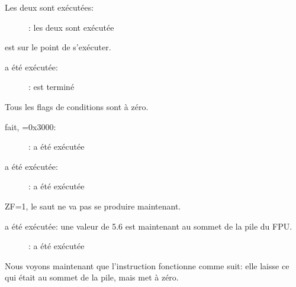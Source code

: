 \clearpage
{}

Les deux \FLD sont exécutées:

\begin{figure}[H]
\centering
{}
\caption{\olly: les deux \FLD sont exécutée}
\label{fig:FPU_comparison_Ox_case2_olly1}
\end{figure}

\FCOM est sur le point de s'exécuter.

\clearpage
\FCOM a été exécutée:

\begin{figure}[H]
\centering
{}
\caption{\olly: \FCOM est terminé}
\label{fig:FPU_comparison_Ox_case2_olly2}
\end{figure}

Tous les flags de conditions sont à zéro.

\clearpage
\FNSTSW fait, =0x3000:

\begin{figure}[H]
\centering
{}
\caption{\olly: \FNSTSW a été exécutée}
\label{fig:FPU_comparison_Ox_case2_olly3}
\end{figure}

\clearpage
\TEST a été exécutée:

\begin{figure}[H]
\centering
{}
\caption{\olly: \TEST a été exécutée}
\label{fig:FPU_comparison_Ox_case2_olly4}
\end{figure}

ZF=1, le saut ne va pas se produire maintenant.

\clearpage
\FSTP {} a été exécutée: une valeur de 5.6 est maintenant au sommet de la pile
du FPU.

\begin{figure}[H]
\centering
{}
\caption{\olly: \FSTP a été exécutée}
\label{fig:FPU_comparison_Ox_case2_olly5}
\end{figure}

Nous voyons maintenant que l'instruction \FSTP {}
fonctionne comme suit: elle laisse ce qui était au sommet de la pile, mais met 
à zéro.

